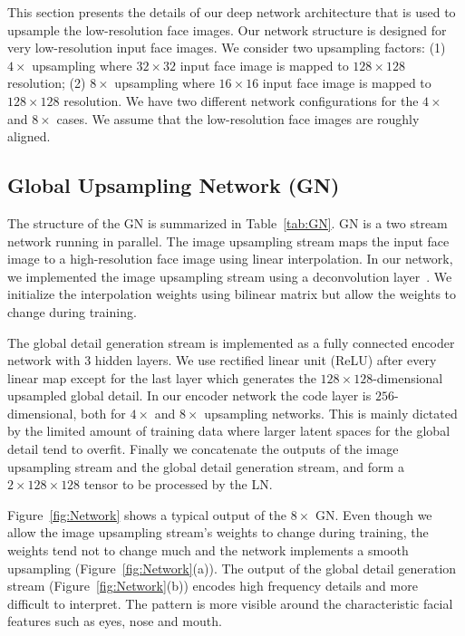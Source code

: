 \documentclass[runningheads]{llncs}
\begin{document}
This section presents the details of our deep network architecture that is used to upsample the low-resolution face images.
%
Our network structure is designed for very low-resolution input face images. We consider two upsampling factors: (1) $4 \times$ upsampling where  $32 \times 32$ input face image is mapped to $128 \times 128$ resolution; (2) $8 \times$ upsampling where  $16 \times 16$ input face image is mapped to $128 \times 128$ resolution. We have two different network configurations for the $4 \times$ and $8 \times$ cases. We assume that the low-resolution face images are roughly aligned.



\subsection{Global Upsampling Network (GN)}

The structure of the GN is summarized in Table~\ref{tab:GN}. GN is a two stream network running in parallel. The image upsampling stream maps the input face image to a high-resolution face image using linear interpolation. In our network, we implemented the image upsampling stream using a deconvolution layer~\cite{zeiler2010deconvolutional,Long15}. We initialize the interpolation weights using bilinear matrix but allow the weights to change during training.


The global detail generation stream is implemented as a fully connected encoder network with 3 hidden layers. We use rectified linear unit (ReLU) after every linear map except for the last layer which generates the $128 \times 128$-dimensional upsampled global detail. In our encoder network the code layer is $256$-dimensional, both for $4 \times$ and $8 \times$ upsampling networks. This is mainly dictated by the limited amount of training data where larger latent spaces for the global detail tend to overfit. Finally we concatenate the outputs of the image upsampling stream and the global detail generation stream, and form a $2 \times 128 \times 128$ tensor to be processed by the LN.


Figure~\ref{fig:Network} shows a typical output of the $8 \times$ GN. Even though we allow the image upsampling stream's weights to change during training, the weights tend not to change much and the network implements a smooth upsampling (Figure~\ref{fig:Network}(a)). The output of the global detail generation stream (Figure~\ref{fig:Network}(b)) encodes high frequency details and more difficult to interpret. The pattern is more visible around the characteristic facial features such as eyes, nose and mouth.
\end{document}
